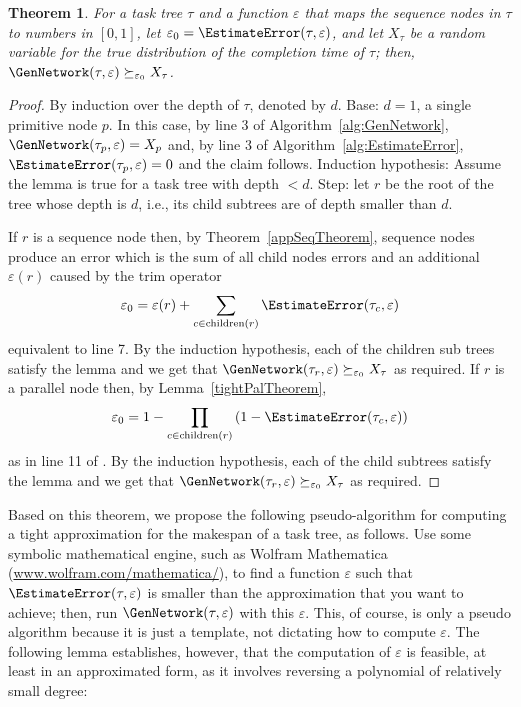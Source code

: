 \documentclass[review]{elsarticle}
\newtheorem{theorem}{Theorem}
\DeclareMathOperator{\ch}{\operatorname{children}}
\begin{document}
\begin{theorem}\label{theorem:approxEps0}
	For a task tree $\tau$ and a function $\varepsilon$ that maps the sequence nodes in $\tau$ to numbers in $[0,1]$, let 
	$\varepsilon_0=\EstimateError(\tau,\varepsilon)$, and let $X_{\tau}$ be a random variable for the true
	distribution of the completion time of $\tau$; then, $\GenNetwork(\tau, \varepsilon) \succeq_{\varepsilon_0} X_{\tau}$. 
\end{theorem}

\begin{proof}
By induction over the depth of $\tau$, denoted by $d$. Base: $ d=1$, a single primitive node $p$. 
In this case, by line 3 of Algorithm~\ref{alg:GenNetwork}, $\GenNetwork(\tau_p,\varepsilon)=X_p$ and, by line 3 of Algorithm~\ref{alg:EstimateError},  $\EstimateError(\tau_p,\varepsilon)=0$ and the claim follows.
Induction hypothesis: Assume the lemma is true for a task tree with depth $ <d $. Step: let $r$ be the root of the tree whose depth is $d$, i.e., its child subtrees are of depth smaller than $d$.

If $r$ is a sequence node then,	by Theorem~\ref{appSeqTheorem}, sequence nodes produce an error which is the sum of all child nodes errors and an additional $\varepsilon(r)$ caused by the trim operator $$\varepsilon_0={\varepsilon(r)+\sum_{c \in \ch(r)}{\EstimateError(\tau_c,\varepsilon)}}$$ equivalent to \EstimateError line 7. By the induction hypothesis, each of the children sub trees satisfy the lemma and we get that $\GenNetwork(\tau_{r}, \varepsilon) \succeq_{\varepsilon_0} X_\tau$ as required.
	If $r$ is a parallel node then,
	by Lemma~\ref{tightPalTheorem}, $$\varepsilon_0=1-\prod_{c \in \ch(r)}{(1-\EstimateError(\tau_c,\varepsilon))}$$ as in line 11 of \EstimateError. By the induction hypothesis, each of the child subtrees satisfy the lemma and we get that $\GenNetwork(\tau_{r}, \varepsilon) \succeq_{\varepsilon_0} X_\tau$ as required.
\end{proof}


Based on this theorem, we propose the following pseudo-algorithm for computing a tight approximation for the makespan of a task tree, as follows. Use some symbolic mathematical engine, such as Wolfram Mathematica (\url{www.wolfram.com/mathematica/}), to find a function $\varepsilon$ such that $\EstimateError(\tau,\varepsilon)$ is smaller than the approximation that you want to achieve; then, run $\GenNetwork(\tau,\varepsilon)$ with this $\varepsilon$. This, of course, is only a pseudo algorithm because it is just a template, not dictating how to compute $\varepsilon$.
The following lemma establishes, however, that the computation of $\varepsilon$ is feasible, at least in an approximated form, as it involves reversing a polynomial of relatively small degree:
\end{document}
